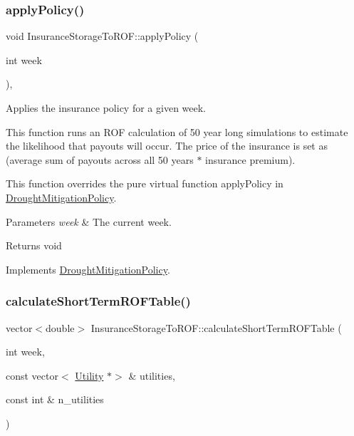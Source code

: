 \subsubsection{\texorpdfstring{apply\+Policy()}{applyPolicy()}}
{\footnotesize\ttfamily void Insurance\+Storage\+To\+R\+O\+F\+::apply\+Policy (\begin{DoxyParamCaption}\item[{int}]{week }\end{DoxyParamCaption})\hspace{0.3cm}{\ttfamily [override]}, {\ttfamily [virtual]}}



Applies the insurance policy for a given week. 

This function runs an R\+OF calculation of 50 year long simulations to estimate the likelihood that payouts will occur. The price of the insurance is set as (average sum of payouts across all 50 years $\ast$ insurance premium).

This function overrides the pure virtual function apply\+Policy in \mbox{\hyperlink{classDroughtMitigationPolicy}{Drought\+Mitigation\+Policy}}.


\begin{DoxyParams}{Parameters}
{\em week} & The current week.\\
\hline
\end{DoxyParams}
\begin{DoxyReturn}{Returns}
void 
\end{DoxyReturn}


Implements \mbox{\hyperlink{classDroughtMitigationPolicy_a76c1a85eaf7707306fe173b6437cc31d}{Drought\+Mitigation\+Policy}}.

\mbox{\label{classInsuranceStorageToROF_a0a79476bd868966a79ea03e0abdbfde2}} 
\subsubsection{\texorpdfstring{calculate\+Short\+Term\+R\+O\+F\+Table()}{calculateShortTermROFTable()}}
{\footnotesize\ttfamily vector$<$double$>$ Insurance\+Storage\+To\+R\+O\+F\+::calculate\+Short\+Term\+R\+O\+F\+Table (\begin{DoxyParamCaption}\item[{int}]{week,  }\item[{const vector$<$ \mbox{\hyperlink{classUtility}{Utility}} $\ast$$>$ \&}]{utilities,  }\item[{const int \&}]{n\+\_\+utilities }\end{DoxyParamCaption})}



